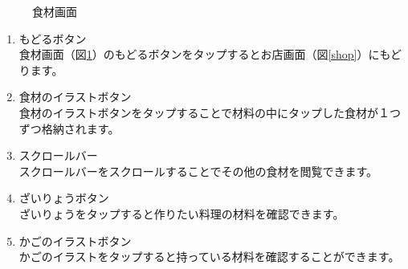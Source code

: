 \documentclass[a4j]{jarticle}
\begin{document}
\begin{figure}[H]
    \begin{center}
    \caption {食材画面}
    \label{shop_material}
    \end{center}
\end{figure}

\begin{enumerate}
  \renewcommand{\labelenumi}{\textcircled{\scriptsize \theenumi}}
\item もどるボタン\\
  食材画面（図\ref{shop_material}）のもどるボタンをタップするとお店画面（図\ref{shop}）にもどります。
\item 食材のイラストボタン\\
  食材のイラストボタンをタップすることで材料の中にタップした食材が１つずつ格納されます。
\item スクロールバー\\
  スクロールバーをスクロールすることでその他の食材を閲覧できます。
\item ざいりょうボタン\\
  ざいりょうをタップすると作りたい料理の材料を確認できます。
\item かごのイラストボタン\\
  かごのイラストをタップすると持っている材料を確認することができます。
\end{enumerate}
\end{document}
